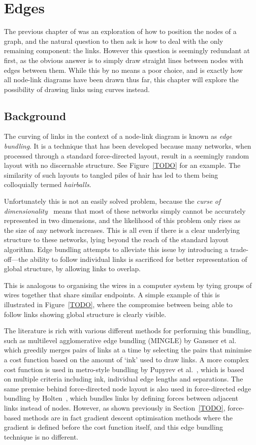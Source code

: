 \chapter{Edges}
The previous chapter of was an exploration of how to position the nodes of a graph, and the natural question to then ask is how to deal with the only remaining component: the links. However this question is seemingly redundant at first, as the obvious answer is to simply draw straight lines between nodes with edges between them. While this by no means a poor choice, and is exactly how all node-link diagrams have been drawn thus far, this chapter will explore the possibility of drawing links using curves instead.

\section{Background}
The curving of links in the context of a node-link diagram is known as \textit{edge bundling}. It is a technique that has been developed because many networks, when processed through a standard force-directed layout, result in a seemingly random layout with no discernable structure. See Figure~\ref{TODO} for an example. The similarity of such layouts to tangled piles of hair has led to them being colloquially termed \textit{hairballs}.

Unfortunately this is not an easily solved problem, because the \textit{curse of dimensionality}~\cite{TODO} means that most of these networks simply cannot be accurately represented in two dimensions, and the likelihood of this problem only rises as the size of any network increases. This is all even if there is a clear underlying structure to these networks, lying beyond the reach of the standard layout algorithm.
Edge bundling attempts to alleviate this issue by introducing a trade-off---the ability to follow individual links is sacrificed for better representation of global structure, by allowing links to overlap.

This is analogous to organising the wires in a computer system by tying groups of wires together that share similar endpoints. A simple example of this is illustrated in Figure~\ref{TODO}, where the compromise between being able to follow links showing global structure is clearly visible.

The literature is rich with various different methods for performing this bundling, such as multilevel agglomerative edge bundling (MINGLE) by Gansner et al.~\cite{TODO} which greedily merges pairs of links at a time by selecting the pairs that minimise a cost function based on the amount of `ink' used to draw links. A more complex cost function is used in metro-style bundling by Pupyrev et al.~\cite{TODO}, which is based on multiple criteria including ink, individual edge lengths and separations. 
The same premise behind force-directed node layout is also used in force-directed edge bundling by Holten~\cite{TODO}, which bundles links by defining forces between adjacent links instead of nodes. However, as shown previously in Section~\ref{TODO}, force-based methods are in fact gradient descent optimisation methods where the gradient is defined before the cost function itself, and this edge bundling technique is no different.

